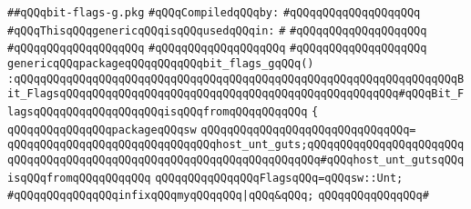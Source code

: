 \label{src/lib/std/src/bit-flags-g.pkg}
\verb|##qQQqbit-flags-g.pkg|\newline
\newline
\verb|#qQQqCompiledqQQqby:|\newline
\verb|#qQQqqQQqqQQqqQQqqQQq|\newline
\newline
\verb|#qQQqThisqQQqgenericqQQqisqQQqusedqQQqin:|\newline
\verb|#|\newline
\verb|#qQQqqQQqqQQqqQQqqQQq|\newline
\verb|#qQQqqQQqqQQqqQQqqQQq|\newline
\verb|#qQQqqQQqqQQqqQQqqQQq|\newline
\verb|#qQQqqQQqqQQqqQQqqQQq|\newline
\newline
\verb|genericqQQqpackageqQQqqQQqqQQqbit_flags_gqQQq()|\newline
\verb|:qQQqqQQqqQQqqQQqqQQqqQQqqQQqqQQqqQQqqQQqqQQqqQQqqQQqqQQqqQQqqQQqqQQqBit_FlagsqQQqqQQqqQQqqQQqqQQqqQQqqQQqqQQqqQQqqQQqqQQqqQQqqQQq#qQQqBit_FlagsqQQqqQQqqQQqqQQqqQQqisqQQqfromqQQqqQQqqQQq|\newline
\verb|{|\newline
\verb|qQQqqQQqqQQqqQQqpackageqQQqsw|\newline
\verb|qQQqqQQqqQQqqQQqqQQqqQQqqQQqqQQq=|\newline
\verb|qQQqqQQqqQQqqQQqqQQqqQQqqQQqqQQqhost_unt_guts;qQQqqQQqqQQqqQQqqQQqqQQqqQQqqQQqqQQqqQQqqQQqqQQqqQQqqQQqqQQqqQQqqQQqqQQq#qQQqhost_unt_gutsqQQqisqQQqfromqQQqqQQqqQQq|\newline
\newline
\verb|qQQqqQQqqQQqqQQqFlagsqQQq=qQQqsw::Unt;|\newline
\newline
\verb|#qQQqqQQqqQQqqQQqinfixqQQqmyqQQqqQQq|\verb#|qQQq&qQQq;#\newline
\verb|qQQqqQQqqQQqqQQq#|\newline
